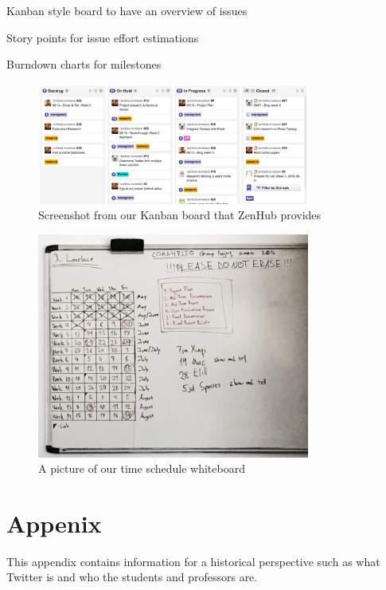 \documentclass{article}
\begin{document}
\begin{samepage}
\begin{itemize*}
	\item Kanban style board to have an overview of issues
	\item Story points for issue effort estimations
	\item Burndown charts for milestones
\end{itemize*}
\end{samepage}


\begin{figure}[H]
    \centering
    \includegraphics[width=0.8\textwidth]{kanbanboard}  
    \caption{Screenshot from our Kanban board that ZenHub provides}
\end{figure}

\begin{figure}[H]
    \centering
    \includegraphics[width=0.8\textwidth]{whiteboard}    
    \caption{A picture of our time schedule whiteboard}
\end{figure}


\newpage


\section{Appenix}
This appendix contains information for a historical perspective such as what Twitter is and who the students and professors are. 
\end{document}
